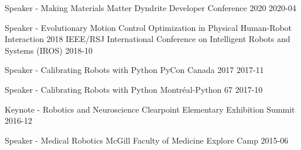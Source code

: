 \begin{cvhonors}

\cvhonor
{Speaker - Making Materials Matter}
{Dyndrite Developer Conference 2020}
{}
{2020-04}

\cvhonor
{Speaker - Evolutionary Motion Control Optimization in Physical Human-Robot Interaction}
{2018 IEEE/RSJ International Conference on Intelligent Robots and Systems (IROS)}
{}
{2018-10}

\cvhonor
{Speaker - Calibrating Robots with Python}
{PyCon Canada 2017}
{}
{2017-11}

\cvhonor
{Speaker - Calibrating Robots with Python}
{Montréal-Python 67}
{}
{2017-10}

\cvhonor
{Keynote - Robotics and Neuroscience}
{Clearpoint Elementary Exhibition Summit}
{}
{2016-12}

\cvhonor
{Speaker - Medical Robotics}
{McGill Faculty of Medicine Explore Camp}
{}
{2015-06}




\end{cvhonors}
